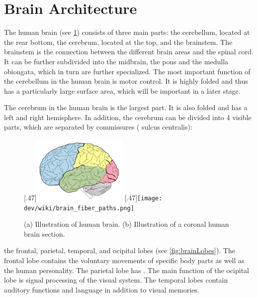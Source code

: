 \section{Brain Architecture}
%
The human brain (see \cref{fig:humanBrain}) consists of three main parts: the cerebellum, located at the rear bottom, the cerebrum, located at the top, and the brainstem.
The brainstem is the connection between the different brain areas and the spinal cord.
It can be further subdivided into the midbrain, the pons and the medulla obiongata, which in turn are further specialized.
The most important function of the cerebellum in the human brain is motor control.
It is highly folded and thus has a particularly large surface area, which will be important in a later stage.
\par
%
The cerebrum in the human brain is the largest part.
It is also folded and has a left and right hemisphere.
In addition, the cerebrum can be divided into 4 visible parts, which are separated by commissures (\eg{} sulcus centralis):
%
\begin{figure}[!t]
\centering
[.47\textwidth]{\includegraphics[height=3.25cm]{gfx/neuroanatomy/brain_lobes.pdf}}
\hspace*{\fill}
[.47\textwidth]{\texttt{[image: dev/wiki/brain\_fiber\_paths.png]}}
\caption{(a) Illustration of human brain. (b) Illustration of a coronal human brain section. }
\label{fig:humanBrain}
\end{figure}
%
the frontal, parietal, temporal, and ocipital lobes (see \cref{fig:brainLobes}).
The frontal lobe contains the voluntary movements of specific body parts as well as the human personality.
The parietal lobe has \dummy{}.
The main function of the ocipital lobe is signal processing of the visual system.
The temporal lobes contain auditory functions and language in addition to visual memories.
